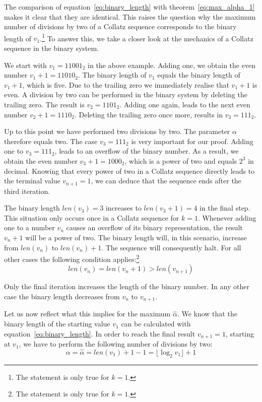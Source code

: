 \documentclass{SciPress_2015}
\begin{document}
The comparison of equation~\ref{eq:binary_length} with theorem~\ref{eq:max_alpha_1} makes it clear that they are identical. This raises the question why the maximum number of divisions by two of a Collatz sequence corresponds to the binary length of $v_1$.\footnote{The statement is only true for $k=1$.} To answer this, we take a closer look at the mechanics of a Collatz sequence in the binary system.

\par\medskip
We start with $v_1=11001_2$ in the above example. Adding one, we obtain the even number $v_1+1=11010_2$. The binary length of $v_1$ equals the binary length of $v_1+1$, which is five. Due to the trailing zero we immediately realise that $v_1+1$ is even. A division by two can be performed in the binary system by deleting the trailing zero. The result is $v_2=1101_2$. Adding one again, leads to the next even number $v_2+1=1110_2$. Deleting the trailing zero once more, results in $v_3=111_2$.

\par\medskip
Up to this point we have performed two divisions by two. The parameter $\alpha$ therefore equals two. The case $v_3=111_2$ is very important for our proof. Adding one to $v_3=111_2$, leads to an overflow of the binary number. As a result, we obtain the even number $v_3+1=1000_2$, which is a power of two and equals $2^3$ in decimal. Knowing that every power of two in a Collatz sequence directly leads to the terminal value $v_{n+1}=1$, we can deduce that the sequence ends after the third iteration.

\par\medskip
The binary length $len(v_3)=3$ increases to $len(v_3+1)=4$ in the final step. This situation only occurs once in a Collatz sequence for $k=1$. Whenever adding one to a number $v_n$ causes an overflow of its binary representation, the result $v_n+1$ will be a power of two. The binary length will, in this scenario, increase from $len(v_n)$ to $len(v_n)+1$. The sequence will consequently halt. For all other cases the following condition applies:\footnote{The statement is only true for $k=1$.}
\[
	len(v_n)=len(v_n+1)>len(v_{n+1})
\]

Only the final iteration increases the length of the binary number. In any other case the binary length decreases from $v_n$ to $v_{n+1}$.

\par\medskip
Let us now reflect what this implies for the maximum $\hat\alpha$. We know that the binary length of the starting value $v_1$ can be calculated with equation~\ref{eq:binary_length}. In order to reach the final result $v_{n+1}=1$, starting at $v_1$, we have to perform the following number of divisions by two:
\begin{equation}
	\alpha=\hat\alpha=len(v_1)+1-1=\lfloor\log_2 v_1\rfloor+1
\end{equation}
\end{document}
